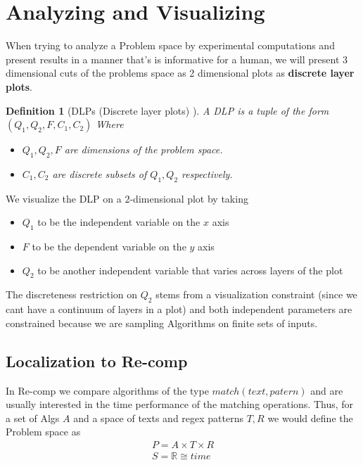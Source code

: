 \documentclass{article}
\numberwithin{theorem}{subsection}
\newtheorem*{definition}{Definition}
\theoremstyle{remark}
\begin{document}
\section*{Analyzing and Visualizing }

When trying to analyze a Problem space by experimental computations and present results in a manner
that's is informative for a human, we will present 3 dimensional cuts of the problems space as 2 dimensional plots as \textbf{discrete layer plots}.

\begin{definition}[DLPs (Discrete layer plots) ]
	A DLP is a tuple of the form $ (Q_{1},Q_{2},F,C_1,C_2) $ Where
	\begin{itemize}
		\item $ Q_1, Q_2, F $ are dimensions of the problem space.
		\item $ C_1,C_2 $ are discrete subsets of $ Q_1,Q_2 $ respectively.
	\end{itemize}
\end{definition}


We visualize the DLP on a $ 2 $-dimensional plot by taking
\begin{itemize}
	\item $ Q_1 $ to be the independent variable on the $ x $ axis
	\item $ F $ to be the dependent variable on the $ y $ axis
	\item $ Q_2 $ to be another independent variable that varies across layers of the plot
\end{itemize}
The discreteness restriction on $ Q_2 $ stems from a visualization constraint (since we cant have a continuum of layers in a plot) and both independent parameters are constrained because we are sampling Algorithms on finite sets of inputs.


\subsection*{Localization to Re-comp}

In Re-comp we compare algorithms of the type $match(text,patern)$ and are usually interested in the time performance of the matching operations. Thus, for a set of Algs $A$ and a space of texts and regex patterns $T,R$ we would define the Problem space as
\[\begin{array}{l}
P=A\times T\times R \\
S=\mathbb{R}\cong time \\
\end{array}
\]
\end{document}
